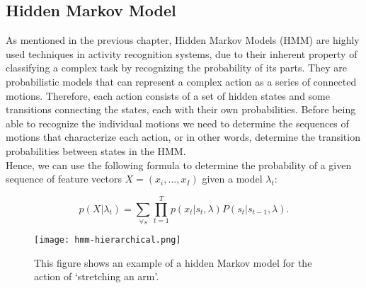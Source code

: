 \documentclass[11pt]{report}
\begin{document}
\subsection{Hidden Markov Model}
As mentioned in the previous chapter, Hidden Markov Models (HMM) are highly used techniques in activity recognition systems, due to their inherent property of classifying a complex task by recognizing the probability of its parts. They are probabilistic models that can represent a complex action as a series of connected motions. Therefore, each action consists of a set of hidden states and some transitions connecting the states, each with their own probabilities. Before being able to recognize the individual motions we need to determine the sequences of motions that characterize each action, or in other words, determine the transition probabilities between states in the HMM. \\
Hence, we can use the following formula to determine the probability of a given sequence of feature vectors \(X = (x_i, ..., x_I)\) given a model \(\lambda_t \):

\begin{equation}
p(X|\lambda_t) = \sum_{\forall s} \prod_{t=1}^T p(x_t|s_t, \lambda) P(s_t|s_{t-1},\lambda).
\end{equation}

\begin{figure}
    \centering
    \texttt{[image: hmm-hierarchical.png]}
    \caption{This figure shows an example of a hidden Markov model for the action of `stretching an arm'.}
    \label{fig:hmm-hierarchical}
\end{figure}
 
\end{document}
